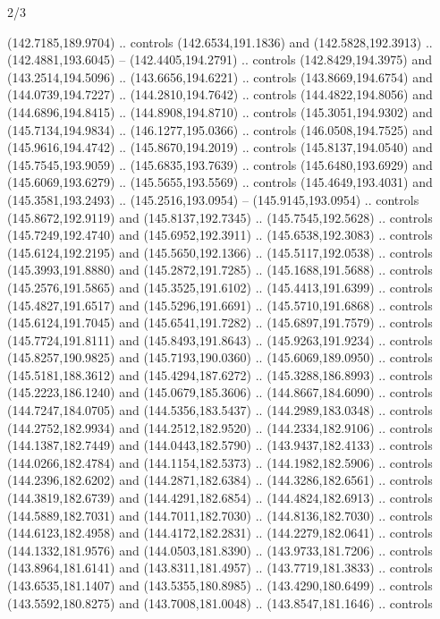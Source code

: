 \begin{flagdescription}{2/3}
\begin{scope}[shift={(0.5\flaglength,0.5)},scale=\flagwidth/320]
\begin{scope}[y=0.8pt, x=0.8pt, yscale=-1,shift={(-118.3,-146)}]
  (142.7185,189.9704) .. controls (142.6534,191.1836) and (142.5828,192.3913) ..
  (142.4881,193.6045) -- (142.4405,194.2791) .. controls (142.8429,194.3975) and
  (143.2514,194.5096) .. (143.6656,194.6221) .. controls (143.8669,194.6754) and
  (144.0739,194.7227) .. (144.2810,194.7642) .. controls (144.4822,194.8056) and
  (144.6896,194.8415) .. (144.8908,194.8710) .. controls (145.3051,194.9302) and
  (145.7134,194.9834) .. (146.1277,195.0366) .. controls (146.0508,194.7525) and
  (145.9616,194.4742) .. (145.8670,194.2019) .. controls (145.8137,194.0540) and
  (145.7545,193.9059) .. (145.6835,193.7639) .. controls (145.6480,193.6929) and
  (145.6069,193.6279) .. (145.5655,193.5569) .. controls (145.4649,193.4031) and
  (145.3581,193.2493) .. (145.2516,193.0954) -- (145.9145,193.0954) .. controls
  (145.8672,192.9119) and (145.8137,192.7345) .. (145.7545,192.5628) .. controls
  (145.7249,192.4740) and (145.6952,192.3911) .. (145.6538,192.3083) .. controls
  (145.6124,192.2195) and (145.5650,192.1366) .. (145.5117,192.0538) .. controls
  (145.3993,191.8880) and (145.2872,191.7285) .. (145.1688,191.5688) .. controls
  (145.2576,191.5865) and (145.3525,191.6102) .. (145.4413,191.6399) .. controls
  (145.4827,191.6517) and (145.5296,191.6691) .. (145.5710,191.6868) .. controls
  (145.6124,191.7045) and (145.6541,191.7282) .. (145.6897,191.7579) .. controls
  (145.7724,191.8111) and (145.8493,191.8643) .. (145.9263,191.9234) .. controls
  (145.8257,190.9825) and (145.7193,190.0360) .. (145.6069,189.0950) .. controls
  (145.5181,188.3612) and (145.4294,187.6272) .. (145.3288,186.8993) .. controls
  (145.2223,186.1240) and (145.0679,185.3606) .. (144.8667,184.6090) .. controls
  (144.7247,184.0705) and (144.5356,183.5437) .. (144.2989,183.0348) .. controls
  (144.2752,182.9934) and (144.2512,182.9520) .. (144.2334,182.9106) .. controls
  (144.1387,182.7449) and (144.0443,182.5790) .. (143.9437,182.4133) .. controls
  (144.0266,182.4784) and (144.1154,182.5373) .. (144.1982,182.5906) .. controls
  (144.2396,182.6202) and (144.2871,182.6384) .. (144.3286,182.6561) .. controls
  (144.3819,182.6739) and (144.4291,182.6854) .. (144.4824,182.6913) .. controls
  (144.5889,182.7031) and (144.7011,182.7030) .. (144.8136,182.7030) .. controls
  (144.6123,182.4958) and (144.4172,182.2831) .. (144.2279,182.0641) .. controls
  (144.1332,181.9576) and (144.0503,181.8390) .. (143.9733,181.7206) .. controls
  (143.8964,181.6141) and (143.8311,181.4957) .. (143.7719,181.3833) .. controls
  (143.6535,181.1407) and (143.5355,180.8985) .. (143.4290,180.6499) .. controls
  (143.5592,180.8275) and (143.7008,181.0048) .. (143.8547,181.1646) .. controls

\end{scope}
\end{scope}
\end{flagdescription}

